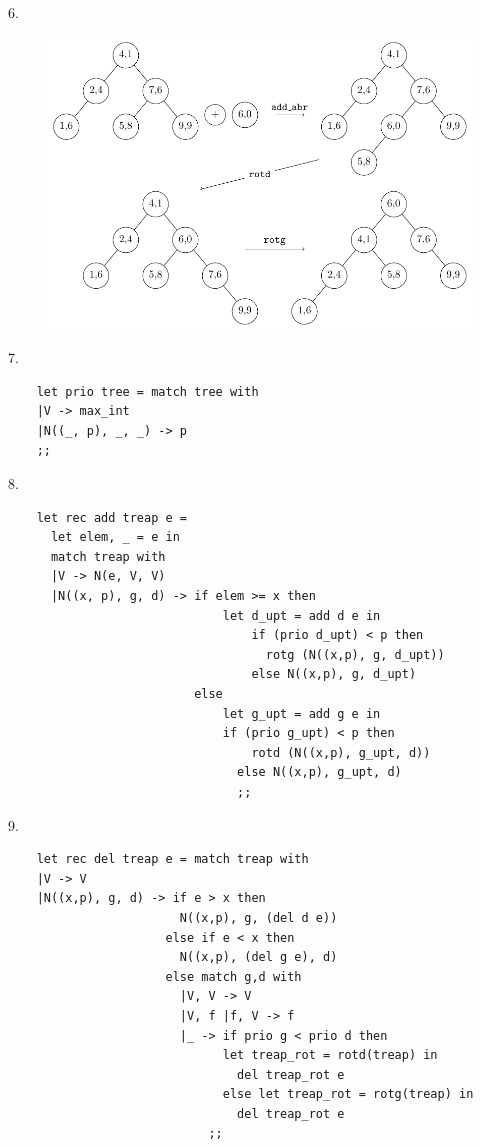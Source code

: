 \documentclass{article}
\begin{document}
6. \begin{figure}[h]
    \centering
    \includegraphics[scale=0.84]{drawing/III_6.pdf}
\end{figure}

7. \begin{verbatim}
    let prio tree = match tree with
    |V -> max_int
    |N((_, p), _, _) -> p
    ;;
\end{verbatim}

8. \begin{verbatim}
    let rec add treap e = 
      let elem, _ = e in
      match treap with
      |V -> N(e, V, V)
      |N((x, p), g, d) -> if elem >= x then 
                              let d_upt = add d e in
                                  if (prio d_upt) < p then
                                    rotg (N((x,p), g, d_upt))
                                  else N((x,p), g, d_upt)
                          else 
                              let g_upt = add g e in
                              if (prio g_upt) < p then
                                  rotd (N((x,p), g_upt, d))
                                else N((x,p), g_upt, d)
                                ;;
\end{verbatim}

9. \begin{verbatim}
    let rec del treap e = match treap with
    |V -> V
    |N((x,p), g, d) -> if e > x then
                        N((x,p), g, (del d e))
                      else if e < x then
                        N((x,p), (del g e), d)
                      else match g,d with
                        |V, V -> V
                        |V, f |f, V -> f
                        |_ -> if prio g < prio d then
                              let treap_rot = rotd(treap) in
                                del treap_rot e
                              else let treap_rot = rotg(treap) in
                                del treap_rot e
                            ;;
\end{verbatim}
\end{document}

